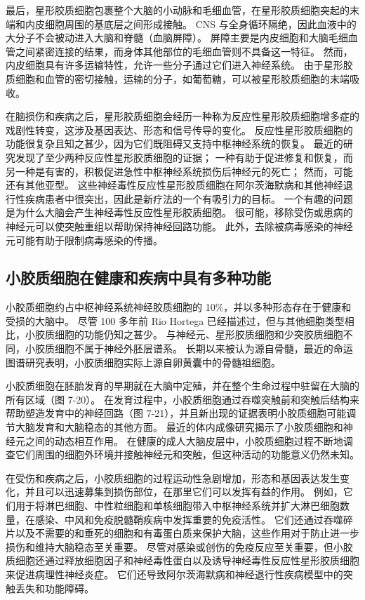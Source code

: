 最后，星形胶质细胞包裹整个大脑的小动脉和毛细血管，在星形胶质细胞突起的末端和内皮细胞周围的基底层之间形成接触。 
CNS 与全身循环隔绝，因此血液中的大分子不会被动进入大脑和脊髓（血脑屏障）。 
屏障主要是内皮细胞和大脑毛细血管之间紧密连接的结果，而身体其他部位的毛细血管则不具备这一特征。 
然而，内皮细胞具有许多运输特性，允许一些分子通过它们进入神经系统。 
由于星形胶质细胞和血管的密切接触，运输的分子，如葡萄糖，可以被星形胶质细胞的末端吸收。


在脑损伤和疾病之后，星形胶质细胞会经历一种称为反应性星形胶质细胞增多症的戏剧性转变，这涉及基因表达、形态和信号传导的变化。 
反应性星形胶质细胞的功能很复杂且知之甚少，因为它们既阻碍又支持中枢神经系统的恢复。 
最近的研究发现了至少两种反应性星形胶质细胞的证据； 一种有助于促进修复和恢复，而另一种是有害的，积极促进急性中枢神经系统损伤后神经元的死亡； 然而，可能还有其他亚型。 
这些神经毒性反应性星形胶质细胞在阿尔茨海默病和其他神经退行性疾病患者中很突出，因此是新疗法的一个有吸引力的目标。 
一个有趣的问题是为什么大脑会产生神经毒性反应性星形胶质细胞。 
很可能，移除受伤或患病的神经元可以使突触重组以帮助保持神经回路功能。 
此外，去除被病毒感染的神经元可能有助于限制病毒感染的传播。


\subsection{小胶质细胞在健康和疾病中具有多种功能}

小胶质细胞约占中枢神经系统神经胶质细胞的 10\%，并以多种形态存在于健康和受损的大脑中。 
尽管 100 多年前 Rio Hortega 已经描述过，但与其他细胞类型相比，小胶质细胞的功能仍知之甚少。 
与神经元、星形胶质细胞和少突胶质细胞不同，小胶质细胞不属于神经外胚层谱系。 
长期以来被认为源自骨髓，最近的命运图谱研究表明，小胶质细胞实际上源自卵黄囊中的骨髓祖细胞。


小胶质细胞在胚胎发育的早期就在大脑中定殖，并在整个生命过程中驻留在大脑的所有区域（图 7-20）。 
在发育过程中，小胶质细胞通过吞噬突触前和突触后结构来帮助塑造发育中的神经回路（图 7-21），并且新出现的证据表明小胶质细胞可能调节大脑发育和大脑稳态的其他方面。 
最近的体内成像研究揭示了小胶质细胞和神经元之间的动态相互作用。 
在健康的成人大脑皮层中，小胶质细胞过程不断地调查它们周围的细胞外环境并接触神经元和突触，但这种活动的功能意义仍然未知。


在受伤和疾病之后，小胶质细胞的过程运动性急剧增加，形态和基因表达发生变化，并且可以迅速募集到损伤部位，在那里它们可以发挥有益的作用。 
例如，它们用于将淋巴细胞、中性粒细胞和单核细胞带入中枢神经系统并扩大淋巴细胞数量，在感染、中风和免疫脱髓鞘疾病中发挥重要的免疫活性。 
它们还通过吞噬碎片以及不需要的和垂死的细胞和有毒蛋白质来保护大脑，这些作用对于防止进一步损伤和维持大脑稳态至关重要。 
尽管对感染或创伤的免疫反应至关重要，但小胶质细胞还通过释放细胞因子和神经毒性蛋白以及诱导神经毒性反应性星形胶质细胞来促进病理性神经炎症。 
它们还导致阿尔茨海默病和神经退行性疾病模型中的突触丢失和功能障碍。


